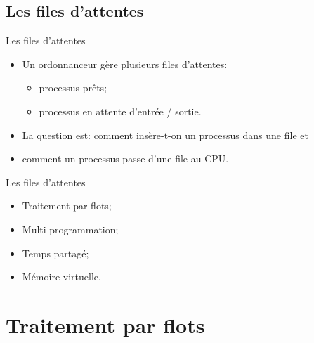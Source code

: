 \begin{frame}{\sectitle}
\section{\sectitle}

\def\subsectitle{Les files d'attentes}
\subsection{\subsectitle}

\begin{block}{\subsectitle}
\begin{itemize}
    \item Un ordonnanceur gère plusieurs files d'attentes: 
    \begin{itemize}
        \item processus prêts;
        \item processus en attente d'entrée / sortie.
    \end{itemize}
    \item La question est: comment insère-t-on un processus dans une file et
    \item comment un processus passe d'une file au CPU.
\end{itemize}
\end{block}

\begin{exampleblock}{\subsectitle}
\begin{itemize}
    \item Traitement par flots;
    \item Multi-programmation;
    \item Temps partagé;
    \item Mémoire virtuelle.
\end{itemize}
\end{exampleblock}

\end{frame}

\def\sectitle{Traitement par flots}
\section{\sectitle}

